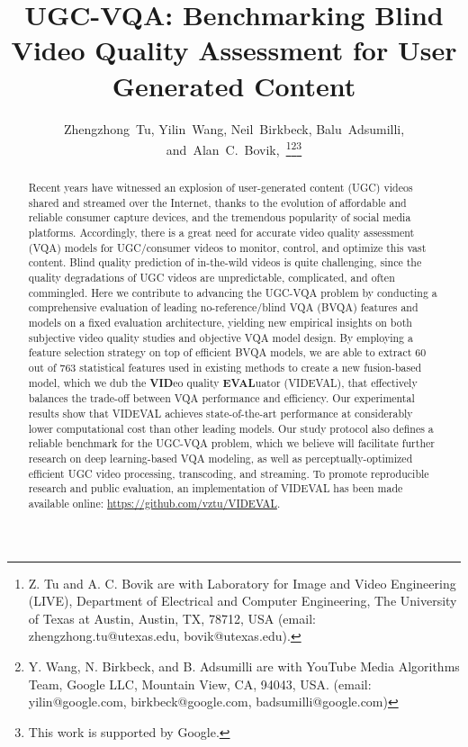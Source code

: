 \documentclass[journal]{IEEEtran}
\begin{document}
\title{UGC-VQA: Benchmarking Blind Video Quality Assessment for User Generated Content}
\author{Zhengzhong~Tu,
        Yilin~Wang,
        Neil~Birkbeck,
        Balu~Adsumilli,
        and~Alan~C.~Bovik,~\thanks{Z. Tu and A. C. Bovik are with Laboratory for Image and Video Engineering (LIVE), Department of Electrical and Computer Engineering, The University of Texas at Austin, Austin, TX, 78712, USA (email: zhengzhong.tu@utexas.edu, bovik@utexas.edu).}\thanks{Y. Wang, N. Birkbeck, and B. Adsumilli are with YouTube Media Algorithms Team, Google LLC, Mountain View, CA, 94043, USA. (email: yilin@google.com, birkbeck@google.com, 
badsumilli@google.com)}\thanks{This work is supported by Google.}}

















\maketitle

\begin{abstract}
Recent years have witnessed an explosion of user-generated content (UGC) videos shared and streamed over the Internet, thanks to the evolution of affordable and reliable consumer capture devices, and the tremendous popularity of social media platforms. Accordingly, there is a great need for accurate video quality assessment (VQA) models for UGC/consumer videos to monitor, control, and optimize this vast content. Blind quality prediction of in-the-wild videos is quite challenging, since the quality degradations of UGC videos are unpredictable, complicated, and often commingled. Here we contribute to advancing the UGC-VQA problem by conducting a comprehensive evaluation of leading no-reference/blind VQA (BVQA) features and models on a fixed evaluation architecture, yielding new empirical insights on both subjective video quality studies and objective VQA model design. By employing a feature selection strategy on top of efficient BVQA models, we are able to extract 60 out of 763 statistical features used in existing methods to create a new fusion-based model, which we dub the \textbf{VID}eo quality \textbf{EVAL}uator (VIDEVAL), that effectively balances the trade-off between VQA performance and efficiency. Our experimental results show that VIDEVAL achieves state-of-the-art performance at considerably lower computational cost than other leading models. Our study protocol also defines a reliable benchmark for the UGC-VQA problem, which we believe will facilitate further research on deep learning-based VQA modeling, as well as perceptually-optimized efficient UGC video processing, transcoding, and streaming. To promote reproducible research and public evaluation, an implementation of VIDEVAL has been made available online: \url{https://github.com/vztu/VIDEVAL}.
\end{abstract}
\end{document}
